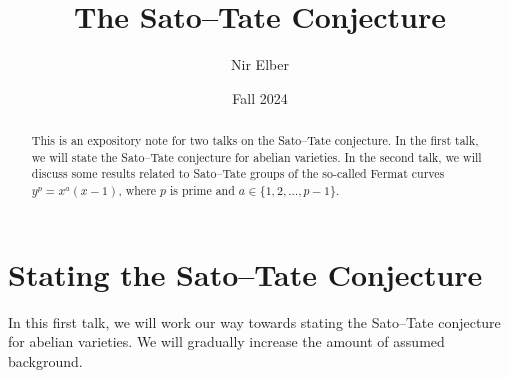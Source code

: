 \documentclass{article}
\title{The Sato--Tate Conjecture}
\author{Nir Elber}
\date{Fall 2024}
\begin{document}
\maketitle

\begin{abstract}
	This is an expository note for two talks on the Sato--Tate conjecture. In the first talk, we will state the Sato--Tate conjecture for abelian varieties. In the second talk, we will discuss some results related to Sato--Tate groups of the so-called Fermat curves $y^p=x^a(x-1)$, where $p$ is prime and $a\in\{1,2,\ldots,p-1\}$.
\end{abstract}

\tableofcontents

\section{Stating the Sato--Tate Conjecture}
In this first talk, we will work our way towards stating the Sato--Tate conjecture for abelian varieties. We will gradually increase the amount of assumed background.
\end{document}
